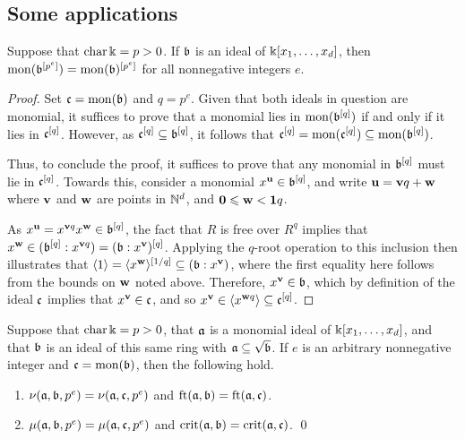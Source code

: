 \documentclass[11pt]{amsart}
\begin{document}
\subsection{Some applications}


\begin{lemma}
Suppose that $\operatorname{char} \Bbbk = p > 0$.  If $\mathfrak{b}$ is an ideal of $\Bbbk[x_1, \ldots, x_d]$, then $\operatorname{mon}(\mathfrak{b}^{[p^e]}) = \operatorname{mon}(\mathfrak{b})^{[p^e]}$ for all nonnegative integers $e$.
\end{lemma}




\begin{proof}  Set $\mathfrak{c} = \operatorname{mon}(\mathfrak{b})$ and $q=p^e$.  Given that both ideals in question are monomial, it suffices to prove that a monomial lies in $\operatorname{mon}(\mathfrak{b}^{[q]})$ if and only if it lies in $\mathfrak{c}^{[q]}$.  However, as $\mathfrak{c}^{[q]} \subseteq \mathfrak{b}^{[q]}$, it follows that
$\mathfrak{c}^{[q]} = \operatorname{mon}(\mathfrak{c}^{[q]}) \subseteq \operatorname{mon}(\mathfrak{b}^{[q]})$.

Thus, to conclude the proof, it suffices to prove that any monomial in $\mathfrak{b}^{[q]}$ must lie in $\mathfrak{c}^{[q]}$.  Towards this, consider a monomial $x^{\mathbf{u}} \in \mathfrak{b}^{[q]}$, and write $\mathbf{u} = \mathbf{v}q + \mathbf{w}$ where $\mathbf{v}$ and $\mathbf{w}$ are points in $\mathbb{N}^d$, and $\mathbf{0} \leqslant \mathbf{w} < \mathbf{1}q$.

As $x^{\mathbf{u}} = x^{\mathbf{v}q} x^{\mathbf{w}} \in \mathfrak{b}^{[q]}$, the fact that $R$ is free over $R^q$ implies that $x^{\mathbf{w}} \in ( \mathfrak{b}^{[q]}: x^{\mathbf{v}q}) = (\mathfrak{b}:x^{\mathbf{v}})^{[q]}$.  Applying the $q$-root operation to this inclusion then illustrates that $\langle 1 \rangle = \langle x^{\mathbf{w}} \rangle^{[1/q]}  \subseteq (\mathfrak{b}: x^{\mathbf{v}})$,  where the first equality here follows from the bounds on $\mathbf{w}$ noted above.   Therefore, $x^{\mathbf{v}} \in \mathfrak{b}$, which by definition of the ideal $\mathfrak{c}$ implies that $x^{\mathbf{v}} \in \mathfrak{c}$, and so $x^{\mathbf{v}} \in \langle x^{\mathbf{w}q} \rangle \subseteq \mathfrak{c}^{[q]}$.
\end{proof}

\begin{corollary}
Suppose that $\operatorname{char} \Bbbk = p > 0$, that $\mathfrak{a}$ is a monomial ideal of $\Bbbk[x_1, \ldots, x_d]$, and that $\mathfrak{b}$ is an ideal of this same ring with $\mathfrak{a} \subseteq \sqrt{\mathfrak{b}}$.  If $e$ is an arbitrary nonnegative integer and $\mathfrak{c} = \operatorname{mon}(\mathfrak{b})$, then the following hold.
\begin{enumerate}
\item $\nu(\mathfrak{a}, \mathfrak{b}, p^e) = \nu(\mathfrak{a}, \mathfrak{c}, p^e)$ and $\operatorname{ft}(\mathfrak{a}, \mathfrak{b}) = \operatorname{ft}(\mathfrak{a}, \mathfrak{c})$.
\item $\mu(\mathfrak{a}, \mathfrak{b}, p^e) = \mu(\mathfrak{a}, \mathfrak{c}, p^e)$ and $\operatorname{crit}(\mathfrak{a},\mathfrak{b}) = \operatorname{crit}(\mathfrak{a},\mathfrak{c})$. \qed
\end{enumerate}
\end{corollary}
\end{document}
